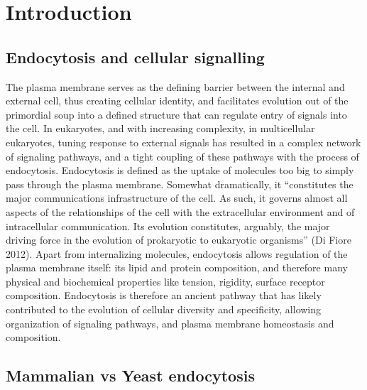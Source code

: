 \chapter{Introduction} %

\label{Ch:Aims} %


\section{Endocytosis and cellular signalling}
The plasma membrane serves as the defining barrier between the internal and external cell, thus creating cellular identity, and facilitates evolution out of the primordial soup into a defined structure that can regulate entry of signals into the cell. In eukaryotes, and with increasing complexity, in multicellular eukaryotes, tuning response to external signals has resulted in a complex network of signaling pathways, and a tight coupling of these pathways with the process of endocytosis. Endocytosis is defined as the uptake of molecules too big to simply pass through the plasma membrane. Somewhat dramatically, it “constitutes the major communications infrastructure of the cell. As such, it governs almost all aspects of the relationships of the cell with the extracellular environment and of intracellular communication. Its evolution constitutes, arguably, the major driving force in the evolution of prokaryotic to eukaryotic organisms” (Di Fiore 2012).  Apart from internalizing molecules, endocytosis allows regulation of the plasma membrane itself: its lipid and protein composition, and therefore many physical and biochemical properties like tension, rigidity, surface receptor composition. Endocytosis is therefore an ancient pathway that has likely contributed to the evolution of cellular diversity and specificity, allowing organization of signaling pathways, and plasma membrane homeostasis and composition. 



	
	\section{Mammalian vs Yeast endocytosis}
	
